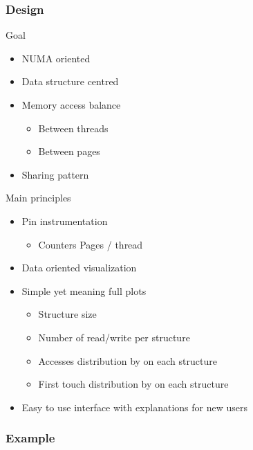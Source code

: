 \documentclass[xcolor={usenames,dvipsnames}]{beamer}
\begin{document}
\subsubsection*{Design}
\begin{frame}{Goal}
    \begin{itemize}[<+->]
        \item NUMA oriented
        \item Data structure centred
        \item Memory access balance 
            \begin{itemize}
                \item Between threads
                \item Between pages
            \end{itemize}
        \item Sharing pattern
    \end{itemize}
\end{frame}

\begin{frame}{Main principles}
    \begin{itemize}[<+->]
        \item Pin instrumentation
            \begin{itemize}
                \item Counters Pages / thread
            \end{itemize}
        \item Data oriented visualization
        \item Simple yet meaning full plots
            \begin{itemize}
                \item Structure size
                \item Number of read/write per structure
                \item \alert{Accesses distribution by on each structure}
                \item \alert{First touch distribution by on each structure}
            \end{itemize}
        \item Easy to use interface with explanations for new users
    \end{itemize}
\end{frame}

\subsubsection*{Example}
\end{document}
